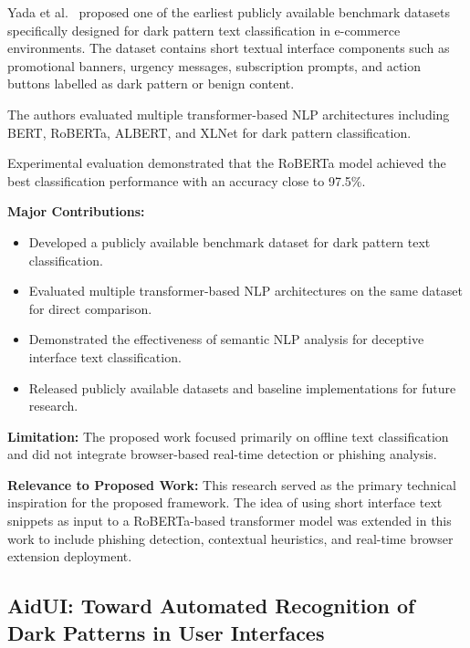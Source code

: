 Yada et al.~\cite{yada2022} proposed one of the earliest publicly available benchmark datasets specifically designed for dark pattern text classification in e-commerce environments. The dataset contains short textual interface components such as promotional banners, urgency messages, subscription prompts, and action buttons labelled as dark pattern or benign content.

The authors evaluated multiple transformer-based NLP architectures including BERT, RoBERTa, ALBERT, and XLNet for dark pattern classification.

Experimental evaluation demonstrated that the RoBERTa model achieved the best classification performance with an accuracy close to 97.5\%.

\vspace{0.3cm}

\textbf{Major Contributions:}
\begin{itemize}
\item Developed a publicly available benchmark dataset for dark pattern text classification.
\item Evaluated multiple transformer-based NLP architectures on the same dataset for direct comparison.
\item Demonstrated the effectiveness of semantic NLP analysis for deceptive interface text classification.
\item Released publicly available datasets and baseline implementations for future research.
\end{itemize}

\vspace{0.3cm}

\textbf{Limitation:}
The proposed work focused primarily on offline text classification and did not integrate browser-based real-time detection or phishing analysis.

\vspace{0.3cm}

\textbf{Relevance to Proposed Work:}
This research served as the primary technical inspiration for the proposed framework. The idea of using short interface text snippets as input to a RoBERTa-based transformer model was extended in this work to include phishing detection, contextual heuristics, and real-time browser extension deployment.


\subsection{AidUI: Toward Automated Recognition of Dark Patterns in User Interfaces}

